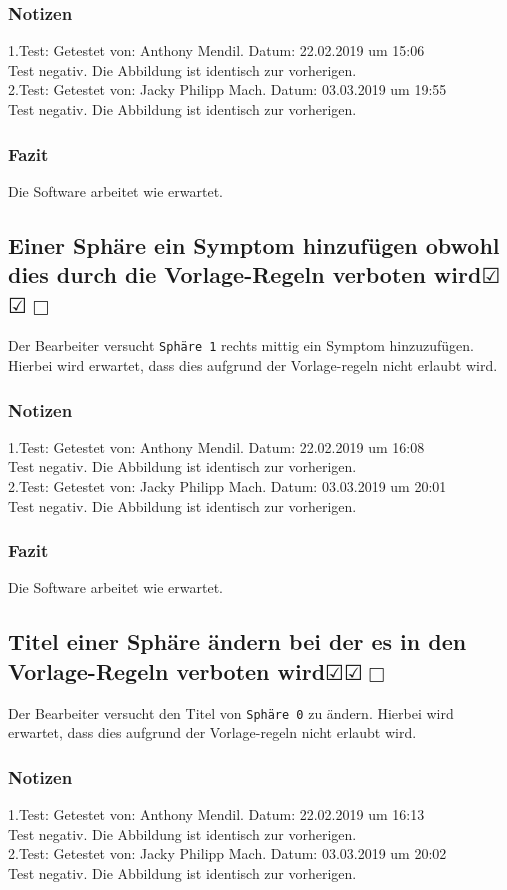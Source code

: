 \documentclass[enabledeprecatedfontcommands]{scrartcl}
\newcommand{\subsectiont}[2]{\subsection[#1]{#1{\normalsize\normalfont #2}}}
\newcommand{\leer}{$\Box$}
\newcommand{\ok}{$\CheckedBox$}
\begin{document}
\subsubsection{Notizen}
1.Test: Getestet von: Anthony Mendil. Datum: 22.02.2019 um 15:06 \\
Test negativ. Die Abbildung ist identisch zur vorherigen.\\
2.Test: Getestet von: Jacky Philipp Mach. Datum: 03.03.2019 um 19:55 \\
Test negativ. Die Abbildung ist identisch zur vorherigen.
\subsubsection{Fazit}
Die Software arbeitet wie erwartet.

\subsectiont{Einer Sphäre ein Symptom hinzufügen obwohl dies durch die Vorlage-Regeln verboten wird}{\dotfill\ok\ok\leer}
Der Bearbeiter versucht \texttt{Sphäre 1} rechts mittig ein Symptom hinzuzufügen. Hierbei wird erwartet, dass dies aufgrund der Vorlage-regeln nicht erlaubt wird.
\subsubsection{Notizen}
1.Test: Getestet von: Anthony Mendil. Datum: 22.02.2019 um 16:08 \\
Test negativ. Die Abbildung ist identisch zur vorherigen.\\
2.Test: Getestet von: Jacky Philipp Mach. Datum: 03.03.2019 um 20:01 \\
Test negativ. Die Abbildung ist identisch zur vorherigen.
\subsubsection{Fazit}
Die Software arbeitet wie erwartet.

\subsectiont{Titel einer Sphäre ändern bei der es in den Vorlage-Regeln verboten wird}{\dotfill\ok\ok\leer}
Der Bearbeiter versucht den Titel von \texttt{Sphäre 0} zu ändern. Hierbei wird erwartet, dass dies aufgrund der Vorlage-regeln nicht erlaubt wird.
\subsubsection{Notizen}
1.Test: Getestet von: Anthony Mendil. Datum: 22.02.2019 um 16:13 \\
Test negativ. Die Abbildung ist identisch zur vorherigen.\\
2.Test: Getestet von: Jacky Philipp Mach. Datum: 03.03.2019 um 20:02 \\
Test negativ. Die Abbildung ist identisch zur vorherigen.
\end{document}
